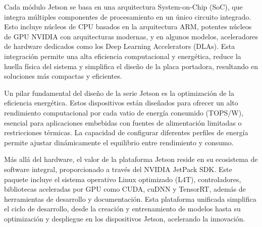 \documentclass[11pt,spanish,listoffigures,listoftables]{tfgetsinf}
\begin{document}
Cada módulo Jetson se basa en una arquitectura System-on-Chip (SoC), que integra múltiples componentes de procesamiento en un único circuito integrado. Esto incluye núcleos de CPU basados en la arquitectura ARM, potentes núcleos de GPU NVIDIA con arquitecturas modernas, y en algunos modelos, aceleradores de hardware dedicados como los Deep Learning Accelerators (DLAs). Esta integración permite una alta eficiencia computacional y energética, reduce la huella física del sistema y simplifica el diseño de la placa portadora, resultando en soluciones más compactas y eficientes.

Un pilar fundamental del diseño de la serie Jetson es la optimización de la eficiencia energética. Estos dispositivos están diseñados para ofrecer un alto rendimiento computacional por cada vatio de energía consumido (TOPS/W), esencial para aplicaciones embebidas con fuentes de alimentación limitadas o restricciones térmicas. La capacidad de configurar diferentes perfiles de energía permite ajustar dinámicamente el equilibrio entre rendimiento y consumo.

Más allá del hardware, el valor de la plataforma Jetson reside en su ecosistema de software integral, proporcionado a través del NVIDIA JetPack SDK. Este paquete incluye el sistema operativo Linux optimizado (L4T), controladores, bibliotecas aceleradas por GPU como CUDA, cuDNN y TensorRT, además de herramientas de desarrollo y documentación. Esta plataforma unificada simplifica el ciclo de desarrollo, desde la creación y entrenamiento de modelos hasta su optimización y despliegue en los dispositivos Jetson, acelerando la innovación.

\begin{table}[H]
   \centering
   \caption{Comparativa técnica entre diferentes modelos NVIDIA Jetson.}
   \label{tab:jetson_comparison}
\end{table}
\end{document}
